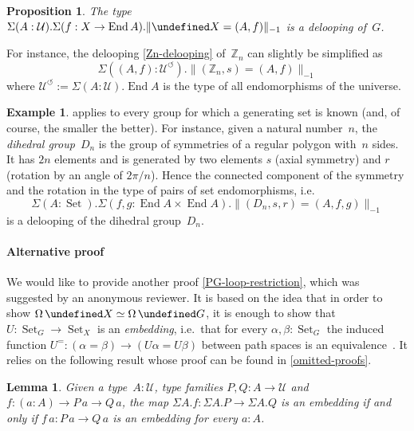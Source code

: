 \documentclass[10pt,a4paper]{amsart}
\newtheorem{proposition}[theorem]{Proposition}
\newtheorem{lemma}[theorem]{Lemma}
\theoremstyle{definition}
\newtheorem{example}[theorem]{Example}
\newcommand{\Z}{\mathbb{Z}} %
\newcommand{\trunc}[2]{\|#2\|_{#1}} %
\newcommand{\ptrunc}[1]{\trunc{-1}{#1}} %
\newcommand{\defd}{:=} %
\newcommand{\equivto}{\simeq} %
\newcommand{\End}{\operatorname{End}} %
\newcommand{\Loop}{\operatorname{\Omega}} %
\let\P\undefined
\newcommand{\P}[1]{\operatorname{P}_{#1}} %
\newcommand{\U}{\mathcal{U}} %
\newcommand{\Type}{\U} %
\newcommand{\Endomorphisms}{\Type^{\circlearrowleft}} %
\newcommand{\Set}{\operatorname{Set}} %
\newcommand{\GSet}[1][G]{\Set_{#1}} %
\newcommand{\XSet}[1][X]{\Set_{#1}} %
\newcommand{\ie}{i.e.~}
\begin{document}
\begin{proposition}
  The type $\Sigma(A:\U).\Sigma(f:X \to\End A).\ptrunc{\P X=(A,f)}$ is a delooping
  of~$G$.
\end{proposition}

\noindent
For instance, the delooping \cref{Zn-delooping} of~$\Z_n$ can slightly be
simplified as
\[
  \Sigma((A,f):\Endomorphisms).\ptrunc{(\Z_n,s)=(A,f)}
\]
where $\Endomorphisms\defd\Sigma(A:\U).\End A$ is the type of all endomorphisms
of the universe.

\begin{example}
  \label{Dn}
   applies to every group for which a generating set
  is known (and, of course, the smaller the better). For instance, given a
  natural number~$n$, the \emph{dihedral group}~$D_n$ is the group of symmetries
  of a regular polygon with~$n$ sides. It has $2n$ elements and is generated by
  two elements $s$ (axial symmetry) and $r$ (rotation by an angle of
  $2\pi/n$). Hence the connected component of the symmetry and the rotation in
  the type of pairs of set endomorphisms, \ie
  \[
    \Sigma(A:\Set).\Sigma(f, g : \End A\times\End A).\ptrunc{(D_n,s,r)=(A,f,g)}
  \]
  is a delooping of the dihedral group~$D_n$.
\end{example}

\paragraph{Alternative proof}
We would like to provide another proof \cref{PG-loop-restriction}, which was suggested by an anonymous reviewer.
It is based on the idea that in order to show $\Loop\P X\equivto\Loop\P G$, it is enough to show that $U:\GSet\to\XSet$ is an \emph{embedding}, \ie that for every $\alpha,\beta:\GSet$ the induced function $U^=:(\alpha=\beta)\to(U\alpha=U\beta)$ between path spaces is an equivalence~\cite[Definition~4.6.1]{hottbook}.
It relies on the following result whose proof can be found in \cref{omitted-proofs}.

\begin{lemma}
  \label{fiberwise-embedding}
  Given a type~$A:\U$, type families $P,Q:A\to\U$ and $f:(a:A)\to P\,a\to Q\,a$, the map $\Sigma A.f:\Sigma A.P\to\Sigma A.Q$ is an embedding if and only
  if $f\,a:P\,a\to Q\,a$ is an embedding for every $a:A$.
\end{lemma}
\end{document}
